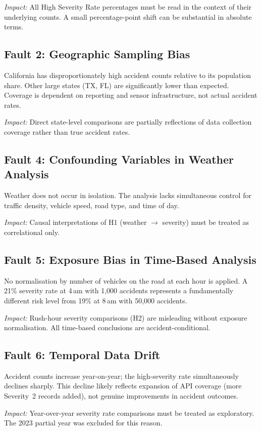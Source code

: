 \textit{Impact:} All High Severity Rate percentages must be read in the context
of their underlying counts. A small percentage-point shift can be substantial
in absolute terms.

\subsection{Fault 2: Geographic Sampling Bias}
California has disproportionately high accident counts relative to its
population share. Other large states (TX, FL) are significantly lower than
expected. Coverage is dependent on reporting and sensor infrastructure, not
actual accident rates.

\textit{Impact:} Direct state-level comparisons are partially reflections of
data collection coverage rather than true accident rates.

\subsection{Fault 4: Confounding Variables in Weather Analysis}
Weather does not occur in isolation. The analysis lacks simultaneous control for
traffic density, vehicle speed, road type, and time of day.

\textit{Impact:} Causal interpretations of H1 (weather $\rightarrow$ severity)
must be treated as correlational only.

\subsection{Fault 5: Exposure Bias in Time-Based Analysis}
No normalisation by number of vehicles on the road at each hour is applied.
A 21\% severity rate at 4\,am with 1,000 accidents represents a fundamentally
different risk level from 19\% at 8\,am with 50,000 accidents.

\textit{Impact:} Rush-hour severity comparisons (H2) are misleading without
exposure normalisation. All time-based conclusions are accident-conditional.

\subsection{Fault 6: Temporal Data Drift}
Accident counts increase year-on-year; the high-severity rate simultaneously
declines sharply. This decline likely reflects expansion of API coverage
(more Severity~2 records added), not genuine improvements in accident outcomes.

\textit{Impact:} Year-over-year severity rate comparisons must be treated as
exploratory. The 2023 partial year was excluded for this reason.

